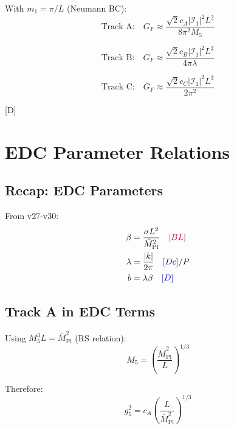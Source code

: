 \documentclass[11pt,a4paper]{article}
\newcommand{\tagD}{\textcolor{blue!70!black}{[D]}}
\newcommand{\tagDc}{\textcolor{blue!50!black}{[Dc]}}
\newcommand{\tagBL}{\textcolor{purple}{[BL]}}
\begin{document}
With $m_1 = \pi/L$ (Neumann BC):
\begin{equation}
\label{eq:dominant-track-a}
\text{Track A:} \quad G_F \approx \frac{\sqrt{2} c_A |\mathcal{I}_1|^2 L^2}{8\pi^2 M_5}
\end{equation}

\begin{equation}
\label{eq:dominant-track-b}
\text{Track B:} \quad G_F \approx \frac{\sqrt{2} c_B |\mathcal{I}_1|^2 L^3}{4\pi \lambda}
\end{equation}

\begin{equation}
\label{eq:dominant-track-c}
\text{Track C:} \quad G_F \approx \frac{\sqrt{2} c_C |\mathcal{I}_1|^2 L^3}{2\pi^2}
\end{equation}

\tagD

\section{EDC Parameter Relations}

\subsection{Recap: EDC Parameters}

From v27-v30:
\begin{align}
\label{eq:edc-beta}
\beta &= \frac{\sigma L^2}{\bar{M}_{\text{Pl}}^2} \quad \tagBL \\
\label{eq:edc-lambda}
\lambda &= \frac{|k|}{2\pi} \quad \tagDc/P \\
\label{eq:edc-b}
b &= \lambda \beta \quad \tagD
\end{align}

\subsection{Track A in EDC Terms}

Using $M_5^3 L = \bar{M}_{\text{Pl}}^2$ (RS relation):
\begin{equation}
\label{eq:M5-Mpl}
M_5 = \left(\frac{\bar{M}_{\text{Pl}}^2}{L}\right)^{1/3}
\end{equation}

Therefore:
\begin{equation}
\label{eq:track-a-edc}
g_5^2 = c_A \left(\frac{L}{\bar{M}_{\text{Pl}}^2}\right)^{1/3}
\end{equation}
\end{document}
